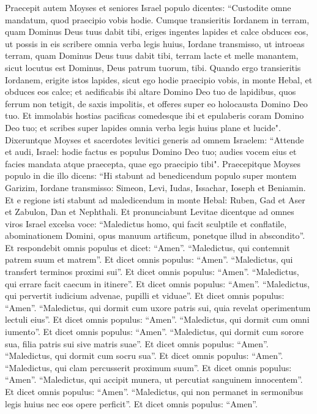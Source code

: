 \begin{biblechapter} 
\verse Praecepit autem Moyses et seniores Israel populo dicentes: “Custodite omne mandatum, quod praecipio vobis hodie. 
\verse Cumque transieritis Iordanem in terram, quam Dominus Deus tuus dabit tibi, eriges ingentes lapides et calce obduces eos,  
\verse ut possis in eis scribere omnia verba legis huius, Iordane transmisso, ut introeas terram, quam Dominus Deus tuus dabit tibi, terram lacte et melle manantem, sicut locutus est Dominus, Deus patrum tuorum, tibi. 
\verse Quando ergo transieritis Iordanem, erigite istos lapides, sicut ego hodie praecipio vobis, in monte Hebal, et obduces eos calce; 
\verse et aedificabis ibi altare Domino Deo tuo de lapidibus, quos ferrum non tetigit, 
\verse de saxis impolitis, et offeres super eo holocausta Domino Deo tuo. 
\verse Et immolabis hostias pacificas comedesque ibi et epulaberis coram Domino Deo tuo; 
\verse et scribes super lapides omnia verba legis huius plane et lucide". 
\verse Dixeruntque Moyses et sacerdotes levitici generis ad omnem Israelem: “Attende et audi, Israel: hodie factus es populus Domino Deo tuo; 
\verse audies vocem eius et facies mandata atque praecepta, quae ego praecipio tibi". 
\verse Praecepitque Moyses populo in die illo dicens: 
\verse “Hi stabunt ad benedicendum populo super montem Garizim, Iordane transmisso: Simeon, Levi, Iudas, Issachar, Ioseph et Beniamin. 
\verse Et e regione isti stabunt ad maledicendum in monte Hebal: Ruben, Gad et Aser et Zabulon, Dan et Nephthali.  
\verse Et pronunciabunt Levitae dicentque ad omnes viros Israel excelsa voce: 
\verse “Maledictus homo, qui facit sculptile et conflatile, abominationem Domini, opus manuum artificum, ponetque illud in abscondito”. Et respondebit omnis populus et dicet: “Amen”. 
\verse “Maledictus, qui contemnit patrem suum et matrem”. Et dicet omnis populus: “Amen”. 
\verse “Maledictus, qui transfert terminos proximi sui”. Et dicet omnis populus: “Amen”. 
\verse “Maledictus, qui errare facit caecum in itinere”. Et dicet omnis populus: “Amen”. 
\verse “Maledictus, qui pervertit iudicium advenae, pupilli et viduae”. Et dicet omnis populus: “Amen”. 
\verse “Maledictus, qui dormit cum uxore patris sui, quia revelat operimentum lectuli eius”. Et dicet omnis populus: “Amen”. 
\verse “Maledictus, qui dormit cum omni iumento”. Et dicet omnis populus: “Amen”. 
\verse “Maledictus, qui dormit cum sorore sua, filia patris sui sive matris suae”. Et dicet omnis populus: “Amen”. 
\verse “Maledictus, qui dormit cum socru sua”. Et dicet omnis populus: “Amen”. 
\verse “Maledictus, qui clam percusserit proximum suum”. Et dicet omnis populus: “Amen”. 
\verse “Maledictus, qui accipit munera, ut percutiat sanguinem innocentem”. Et dicet omnis populus: “Amen”. 
\verse “Maledictus, qui non permanet in sermonibus legis huius nec eos opere perficit”. Et dicet omnis populus: “Amen”. 
\end{biblechapter}

